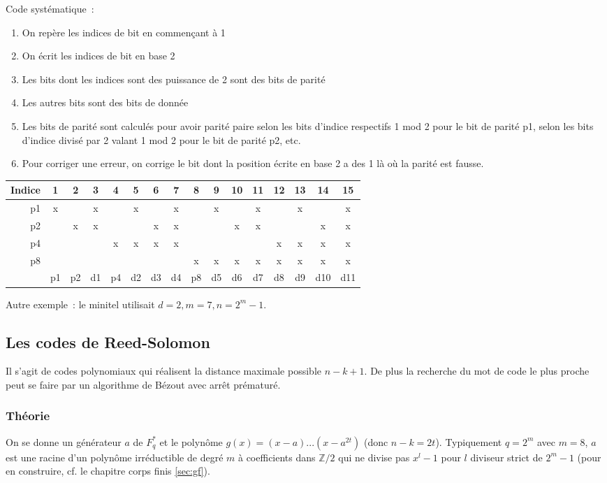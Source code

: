 \documentclass[a4paper,11pt]{article}
\begin{document}
\begin{giacjshere}
Code syst\'ematique~: 
\begin{enumerate}
\item On rep\`ere les indices de bit en commen\c{c}ant
\`a 1
\item On \'ecrit les indices de bit en base 2
\item Les bits dont les indices sont des puissance de 2
sont des bits de parit\'e
\item Les autres bits sont des bits de donn\'ee
\item Les bits de parit\'e sont calcul\'es pour avoir parit\'e
paire selon les bits d'indice respectifs 1 mod 2 pour le bit de
parit\'e p1, selon les bits d'indice divis\'e par 2 valant 1 mod 2 pour le bit de parit\'e p2, etc.
\item Pour corriger une erreur, on corrige le bit dont la position
\'ecrite en base 2 a des 1 l\`a o\`u la parit\'e est fausse.
\end{enumerate}
\begin{tabular}{|r|ccccccccccccccc|} \hline 
Indice & 1 & 2 & 3 & 4 & 5 & 6 & 7 & 8 & 9 & 10 & 11 & 12 & 13 & 14 & 15 \\ \hline
p1     &  x &   & x &   & x  &    & x  &   & x &     &  x   &    & x  &  & x \\
p2     &     & x & x & &     & x  & x &    &    & x  & x    &   &    & x & x \\
p4     &     &    &    & x & x& x& x&      &    &     &       & x& x& x& x \\
p8      &    &    &    &    &    &   &  & x   & x & x  & x   & x & x & x & x \\
\hline 
& p1 & p2 & d1 & p4 & d2 & d3 & d4 & p8 & d5 & d6 & d7 & d8 & d9 & d10 & d11 \\
\hline 
\end{tabular}

Autre exemple~: le minitel utilisait $d=2, m=7, n=2^m-1$.

\subsection{Les codes de Reed-Solomon}
Il s'agit de codes polynomiaux qui r\'ealisent la distance maximale
possible $n-k+1$. De plus la recherche du mot de code le plus
proche peut se faire par un algorithme de B\'ezout avec arr\^et 
pr\'ematur\'e.

\subsubsection{Théorie}
On se donne un g\'en\'erateur $a$ 
de $F_q^*$ et le polyn\^ome $g(x)=(x-a)...(x-a^{2t})$ (donc $n-k=2t$). 
Typiquement $q=2^m$ avec $m=8$, 
$a$ est une racine d'un polyn\^ome irr\'eductible
de degr\'e $m$ à coefficients dans $\mathbb{Z}/2$ 
qui ne divise pas $x^l-1$ pour $l$ diviseur
strict de $2^m-1$ (pour en construire,
cf. le chapitre corps finis \ref{sec:gf}).


\end{giacjshere}
\end{document}
